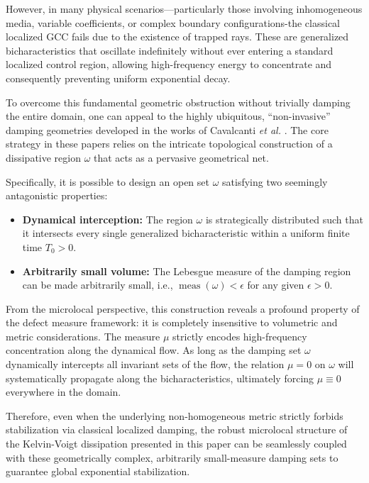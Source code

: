 \documentclass[11pt,letterpaper]{amsart}
\begin{document}
However, in many physical scenarios—particularly those involving inhomogeneous media, variable coefficients, or complex boundary configurations-the classical localized GCC fails due to the existence of trapped rays.  These are generalized bicharacteristics that oscillate indefinitely without ever entering a standard localized control region, allowing high-frequency energy to concentrate and consequently preventing uniform exponential decay.

To overcome this fundamental geometric obstruction without trivially damping the entire domain, one can appeal to the highly ubiquitous, ``non-invasive'' damping geometries developed in the works of Cavalcanti \textit{et al.} \cite{CavalcantiTAMS, CavalcantiARMA, Cavalcanti2018}. The core strategy in these papers relies on the intricate topological construction of a dissipative region $\omega$ that acts as a pervasive geometrical net.

Specifically, it is possible to design an open set $\omega$ satisfying two seemingly antagonistic properties:
\begin{itemize}
    \item \textbf{Dynamical interception:} The region $\omega$ is strategically distributed such that it intersects every single generalized bicharacteristic within a uniform finite time $T_0 > 0$.
    \item \textbf{Arbitrarily small volume:} The Lebesgue measure of the damping region can be made arbitrarily small, i.e., $\operatorname{meas}(\omega) < \epsilon$ for any given $\epsilon > 0$.
\end{itemize}

From the microlocal perspective, this construction reveals a profound property of the defect measure framework: it is completely insensitive to volumetric and metric considerations. The measure $\mu$ strictly encodes high-frequency concentration along the dynamical flow. As long as the damping set $\omega$ dynamically intercepts all invariant sets of the flow, the relation $\mu = 0$ on $\omega$ will systematically propagate along the bicharacteristics, ultimately forcing $\mu \equiv 0$ everywhere in the domain.

Therefore, even when the underlying non-homogeneous metric strictly forbids stabilization via classical localized damping, the robust microlocal structure of the Kelvin-Voigt dissipation presented in this paper can be seamlessly coupled with these geometrically complex, arbitrarily small-measure damping sets to guarantee global exponential stabilization.
\end{document}
